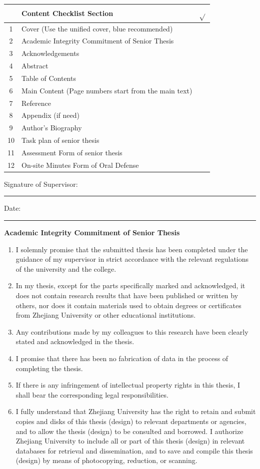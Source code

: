\documentclass[12pt,a4paper]{report}
\newcommand{\fronttitle}[1]{%
  \clearpage
  \begin{center}
    {\bfseries\fontsize{24}{28}\selectfont #1}
  \end{center}
  \vspace{1em}
}
\newcommand{\signatureline}[1]{%
  \noindent #1\hspace{0.5em}\rule{0.32\textwidth}{0.4pt}
}
\begin{document}
\vspace{1em}
\begin{longtable}{|c|p{}|c|}
\hline
 & Content Checklist Section & $\sqrt{}$ \\ \hline
1 & Cover (Use the unified cover, blue recommended) & \\ \hline
2 & Academic Integrity Commitment of Senior Thesis & \\ \hline
3 & Acknowledgements & \\ \hline
4 & Abstract & \\ \hline
5 & Table of Contents & \\ \hline
6 & Main Content (Page numbers start from the main text) & \\ \hline
7 & Reference & \\ \hline
8 & Appendix (if need) & \\ \hline
9 & Author's Biography & \\ \hline
10 & Task plan of senior thesis & \\ \hline
11 & Assessment Form of senior thesis & \\ \hline
12 & On-site Minutes Form of Oral Defense & \\ \hline
\end{longtable}

\vspace{2em}
\signatureline{Signature of Supervisor:}
\hfill
\signatureline{Date:}

\fronttitle{Academic Integrity Commitment of Senior Thesis}

\begin{enumerate}[leftmargin=*,label=\arabic*.]
\item I solemnly promise that the submitted thesis has been completed under the guidance of my supervisor in strict accordance with the relevant regulations of the university and the college.
\item In my thesis, except for the parts specifically marked and acknowledged, it does not contain research results that have been published or written by others, nor does it contain materials used to obtain degrees or certificates from Zhejiang University or other educational institutions.
\item Any contributions made by my colleagues to this research have been clearly stated and acknowledged in the thesis.
\item I promise that there has been no fabrication of data in the process of completing the thesis.
\item If there is any infringement of intellectual property rights in this thesis, I shall bear the corresponding legal responsibilities.
\item I fully understand that Zhejiang University has the right to retain and submit copies and disks of this thesis (design) to relevant departments or agencies, and to allow the thesis (design) to be consulted and borrowed. I authorize Zhejiang University to include all or part of this thesis (design) in relevant databases for retrieval and dissemination, and to save and compile this thesis (design) by means of photocopying, reduction, or scanning.
\end{enumerate}
\end{document}
